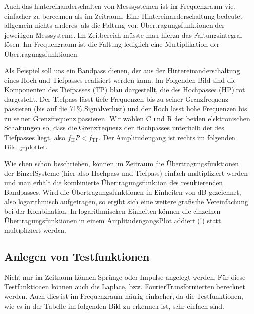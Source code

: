 \documentclass[letterpaper,10pt,english]{jupyterBook}
\begin{document}
\sphinxAtStartPar
Auch das hintereinanderschalten von Messsystemen ist im Frequenzraum viel einfacher zu berechnen als im Zeitraum. Eine Hintereinanderschaltung bedeutet allgemein nichts anderes, als die Faltung von Übertragungsfunktionen der jeweiligen Messsysteme. Im Zeitbereich müsste man hierzu das Faltungsintegral lösen. Im Frequenzraum ist die Faltung lediglich eine Multiplikation der Übertragungsfunktionen.

\sphinxAtStartPar
Als Beispiel soll uns ein Bandpass dienen, der aus der Hintereinanderschaltung eines Hoch\sphinxhyphen{} und Tiefpasses realisiert werden kann. Im Folgenden Bild sind die Komponenten des Tiefpasses (TP) blau dargestellt, die des Hochpasses (HP) rot dargestellt. Der Tiefpass lässt tiefe Frequenzen bis zu seiner Grenzfrequenz passieren (bis auf die 71\% Signalverlust) und der Hoch lässt hohe Frequenzen bis zu seiner Grenzfrequenz passieren. Wir wählen C und R der beiden elektronischen Schaltungen so, dass die Grenzfrequenz der Hochpasses unterhalb der des Tiefpasses liegt, also \(f_\mathrm HP < f_\mathrm{TP}\). Der Amplitudengang ist rechts im folgenden Bild geplottet:

\sphinxAtStartPar
{}

\sphinxAtStartPar
Wie eben schon beschrieben, können im Zeitraum die Übertragungsfunktionen der Einzel\sphinxhyphen{}Systeme (hier also Hochpass und Tiefpass) einfach multipliziert werden und man erhält die kombinierte Übertragungsfunktion des resultierenden Bandpasses. Wird die Übertragungsfunktionen in Einheiten von dB gezeichnet, also logarithmisch aufgetragen, so ergibt sich eine weitere grafische Vereinfachung bei der Kombination: In logarithmischen Einheiten können die einzelnen Übertragungsfunktionen in einem Amplitudengangs\sphinxhyphen{}Plot addiert (!) statt multipliziert werden.


\subsection{Anlegen von Testfunktionen}
\label{\detokenize{content/5_Uebertragungsfunktion:anlegen-von-testfunktionen}}
\sphinxAtStartPar


\sphinxAtStartPar
Nicht nur im Zeitraum können Sprünge oder Impulse angelegt werden. Für diese Testfunktionen können auch die Laplace, bzw. Fourier\sphinxhyphen{}Transformierten berechnet werden. Auch dies ist im Frequenzraum häufig einfacher, da die Testfunktionen, wie es in der Tabelle im folgenden Bild zu erkennen ist, sehr einfach sind.
\end{document}
